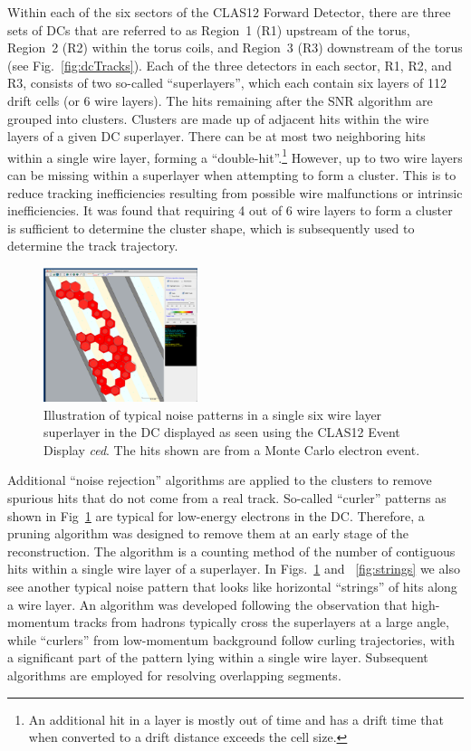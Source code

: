 Within each of the six sectors of the CLAS12 Forward Detector, there are three sets of DCs that are referred to
as Region~1 (R1) upstream of the torus, Region~2 (R2) within the torus coils, and Region~3 (R3) downstream
of the torus (see Fig.~\ref{fig:dcTracks}). Each of the three detectors in each sector, R1, R2, and R3, consists of
two so-called ``superlayers'', which each contain six layers of 112 drift cells (or 6 wire layers). The hits remaining
after the SNR algorithm are grouped into clusters. Clusters are made up of adjacent hits within the wire layers of
a given DC superlayer. There can be at most two neighboring hits within a single wire layer, forming a
``double-hit''.\footnote{An additional hit in a layer is mostly out of time and has a drift time that when converted to a drift
  distance exceeds the cell size.}  However, up to two wire layers can be missing within a superlayer when attempting
to form a cluster.  This is to reduce tracking inefficiencies resulting from possible wire malfunctions or intrinsic
inefficiencies. It was found that requiring 4 out of 6 wire layers to form a cluster is sufficient to determine the
cluster shape, which is subsequently used to determine the track trajectory.

\begin{figure}
\centering
\includegraphics[width=0.4\textwidth]{pics/elooper.png}
\caption{Illustration of typical noise patterns in a single six wire layer superlayer in the DC displayed as seen using
  the CLAS12 Event Display {\it ced}. The hits shown are from a Monte Carlo electron event.}
\label{fig:eloop}
\end{figure}

Additional ``noise rejection'' algorithms are applied to the clusters to remove spurious hits that do not come from
a real track. So-called ``curler'' patterns as shown in Fig~\ref{fig:eloop} are typical for low-energy electrons in
the DC.  Therefore, a pruning algorithm was designed to remove them at an early stage of the reconstruction. The
algorithm is a counting method of the number of contiguous hits within a single wire layer of a superlayer.  In
Figs.~\ref{fig:eloop} and ~\ref{fig:strings} we also see another typical noise pattern that looks like horizontal
``strings'' of hits along a wire layer. An algorithm was developed following  the observation that high-momentum
tracks from hadrons typically cross the superlayers at a large angle, while ``curlers'' from low-momentum
background follow curling trajectories, with a significant part of the pattern lying within a single wire layer.
Subsequent algorithms  are employed for resolving overlapping segments.   

